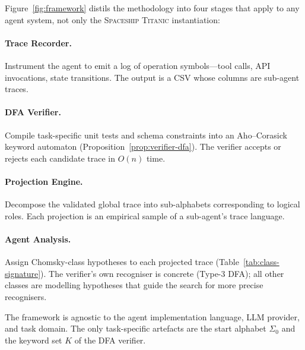Figure~\ref{fig:framework} distils the methodology into four
stages that apply to any agent system, not only the
\textsc{Spaceship Titanic} instantiation:

\paragraph{Trace Recorder.}
Instrument the agent to emit a log of operation symbols---tool
calls, API invocations, state transitions.  The output is a CSV
whose columns are sub-agent traces.

\paragraph{DFA Verifier.}
Compile task-specific unit tests and schema constraints into an
Aho--Corasick keyword automaton
(Proposition~\ref{prop:verifier-dfa}).  The verifier accepts or
rejects each candidate trace in $O(n)$ time.

\paragraph{Projection Engine.}
Decompose the validated global trace into sub-alphabets
corresponding to logical roles.  Each projection is an empirical
sample of a sub-agent's trace language.

\paragraph{Agent Analysis.}
Assign Chomsky-class hypotheses to each projected trace
(Table~\ref{tab:class-signature}).  The verifier's own recogniser is
concrete (Type-3 DFA); all other classes are modelling hypotheses
that guide the search for more precise recognisers.

The framework is agnostic to the agent implementation language,
LLM provider, and task domain.  The only task-specific artefacts
are the start alphabet $\Sigma_0$ and the keyword set $K$ of the
DFA verifier.

